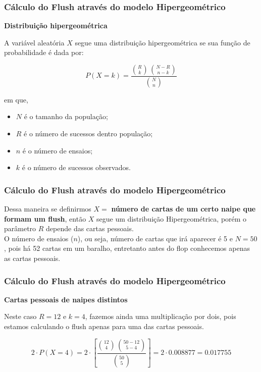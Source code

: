 \documentclass{beamer}
\begin{document}
\begin{frame}
\frametitle{Cálculo do Flush através do modelo Hipergeométrico}
\begin{center}
	{\Large \textbf{Distribuição hipergeométrica}}
\end{center}

A variável aleatória $X$ segue uma distribuição hipergeométrica se sua função de probabilidade é dada por: 

\begin{equation}\label{hip}
	P(X = k) = \dfrac{\binom{R}{k}\,\binom{N - R}{n - k}}{\binom{N}{n}}
\end{equation}

em que,
\begin{itemize}
	\item $N$ é o tamanho da população;
	\item $R$ é o número de sucessos dentro população;
	\item $n$ é o número de ensaios;
	\item $k$ é o número de sucessos observados.
\end{itemize}

\end{frame}

\begin{frame}
\frametitle{Cálculo do Flush através do modelo Hipergeométrico}
Dessa maneira se definirmos $X = $ \textbf{número de cartas de um certo naipe que formam um flush}, então $X$ segue um distribuição Hipergeométrica, porém o parâmetro $R$ depende das cartas pessoais.\\
\vspace{.2cm}
O número de ensaios ($n$), ou seja, número de cartas que irá aparecer é 5 e $N = 50$, pois há 52 cartas em um baralho, entretanto antes do flop conhecemos apenas as cartas pessoais.
\end{frame}
\begin{frame}
\frametitle{Cálculo do Flush através do modelo Hipergeométrico}	

\begin{center}
{\Large \textbf{Cartas pessoais de naipes distintos}}
\end{center}
Neste caso $R = 12$ e $k = 4$, fazemos ainda uma multiplicação por dois, pois estamos calculando o flush apenas para uma das cartas pessoais.

\begin{equation}
2\cdot P(X = 4) = 2\cdot\left[\dfrac{\binom{12}{4}\,\binom{50 - 12}{5 - 4}}{\binom{50}{5}}\right] = 2\cdot0.008877 = 0.017755
\end{equation}
\end{frame}
\end{document}

